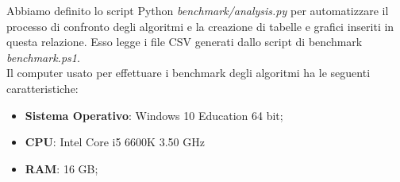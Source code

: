 \noindent Abbiamo definito lo script Python \textit{benchmark/analysis.py} per automatizzare il processo di confronto degli algoritmi e la creazione di tabelle e grafici inseriti in questa relazione. Esso legge i file CSV generati dallo script di benchmark \textit{benchmark.ps1}. \\

\noindent Il computer usato per effettuare i benchmark degli algoritmi ha le seguenti caratteristiche:

\begin{itemize}
    \item \textbf{Sistema Operativo}: Windows 10 Education 64 bit;
    \item \textbf{CPU}: Intel Core i5 6600K 3.50 GHz
    \item \textbf{RAM}: 16 GB;
\end{itemize}
